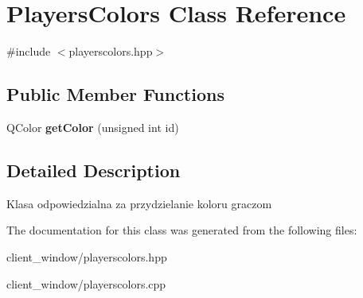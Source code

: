 \hypertarget{classPlayersColors}{}\section{Players\+Colors Class Reference}
\label{classPlayersColors}


{\ttfamily \#include $<$playerscolors.\+hpp$>$}

\subsection*{Public Member Functions}
\begin{DoxyCompactItemize}
\item 
Q\+Color {\bfseries get\+Color} (unsigned int id)\hypertarget{classPlayersColors_a3fe3263d252b9fc02b71c976e9e31a94}{}\label{classPlayersColors_a3fe3263d252b9fc02b71c976e9e31a94}

\end{DoxyCompactItemize}


\subsection{Detailed Description}
Klasa odpowiedzialna za przydzielanie koloru graczom 

The documentation for this class was generated from the following files\+:\begin{DoxyCompactItemize}
\item 
client\+\_\+window/playerscolors.\+hpp\item 
client\+\_\+window/playerscolors.\+cpp\end{DoxyCompactItemize}
